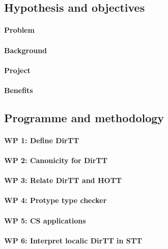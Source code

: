 \documentclass[a4paper,11pt]{article}
\begin{document}
\subsection{Hypothesis and objectives}

\paragraph{Problem}

\paragraph{Background}

\paragraph{Project}

\paragraph{Benefits}

\subsection{Programme and methodology}

\paragraph{WP 1: Define DirTT}

\paragraph{WP 2: Canonicity for DirTT}

\paragraph{WP 3: Relate DirTT and HOTT}

\paragraph{WP 4: Protype type checker}

\paragraph{WP 5: CS applications}

\paragraph{WP 6: Interpret localic DirTT in STT}
\end{document}
